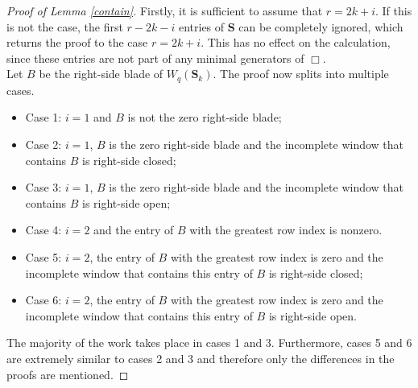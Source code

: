 \documentclass{article}
\theoremstyle{definition}
\numberwithin{equation}{subsection}
\begin{document}
\begin{proof}[Proof of Lemma \ref{contain}]
\noindent Firstly, it is sufficient to assume that $r=2k+i$. If this is not the case, the first $r-2k-i$ entries of $\mathbf{S}$ can be completely ignored, which returns the proof to the case $r=2k+i$. This has no effect on the calculation, since these entries are not part of any minimal generators of $\Box$. \\

\noindent Let $B$ be the right-side blade of $W_q( \mathbf{S}_k)$. The proof now splits into multiple cases.\begin{itemize}
    \item{Case 1:} $i=1$ and $B$ is not the zero right-side blade;
    \item{Case 2:} $i=1$, $B$ is the zero right-side blade and the incomplete window that contains $B$ is right-side closed;
    \item{Case 3:} $i=1$, $B$ is the zero right-side blade and the incomplete window that contains $B$ is right-side open;
    \item{Case 4:} $i=2$ and the entry of $B$ with the greatest row index is nonzero.
    \item{Case 5:} $i=2$, the entry of $B$ with the greatest row index is zero and the incomplete window that contains this entry of $B$ is right-side closed;
    \item{Case 6:} $i=2$, the entry of $B$ with the greatest row index is zero and the incomplete window that contains this entry of $B$ is right-side open.
\end{itemize} 

\noindent The majority of the work takes place in cases 1 and 3. Furthermore, cases 5 and 6 are extremely similar to cases 2 and 3 and therefore only the differences in the proofs are mentioned. 

\end{proof}
\end{document}

